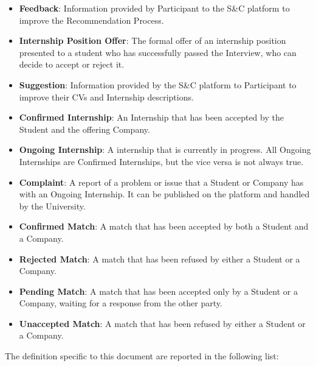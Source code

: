 \begin{itemize}
    \item \textcolor{titleColor}{\textbf{Feedback}\label{def:Feedback}}: Information provided by Participant to the S\&C platform to improve the Recommendation Process.
    \item \textcolor{titleColor}{\textbf{Internship Position Offer}\label{def:internshipPositionOffer}}: The formal offer of an internship position presented to a student who has successfully passed the Interview, who can decide to accept or reject it.
    \item \textcolor{titleColor}{\textbf{Suggestion}\label{def:suggestion}}: Information provided by the S\&C platform to Participant to improve their CVs and Internship descriptions.
    \item \textcolor{titleColor}{\textbf{Confirmed Internship}\label{def:confirmdInternship}}: An Internship that has been accepted by the Student and the offering Company.
    \item \textcolor{titleColor}{\textbf{Ongoing Internship}\label{def:ongoing}}: A internship that is currently in progress. All Ongoing Internships are Confirmed Internships, but the vice versa is not always true.
    \item \textcolor{titleColor}{\textbf{Complaint}\label{def:complaint}}: A report of a problem or issue that a Student or Company has with an Ongoing Internship. It can be published on the platform and handled by the University.
    \item \textcolor{titleColor}{\textbf{Confirmed Match}\label{def:confirmedMatch}}: A match that has been accepted by both a Student and a Company.
    \item \textcolor{titleColor}{\textbf{Rejected Match}\label{def:rejectedMatch}}: A match that has been refused by either a Student or a Company.
    \item \textcolor{titleColor}{\textbf{Pending Match}\label{def:pendingMatch}}: A match that has been accepted only by a Student or a Company, waiting for a response from the other party.
    \item \textcolor{titleColor}{\textbf{Unaccepted Match}\label{def:unacceptedMatch}}: A match that has been refused by either a Student or a Company.
\end{itemize}
The definition specific to this document are reported in the following list:
